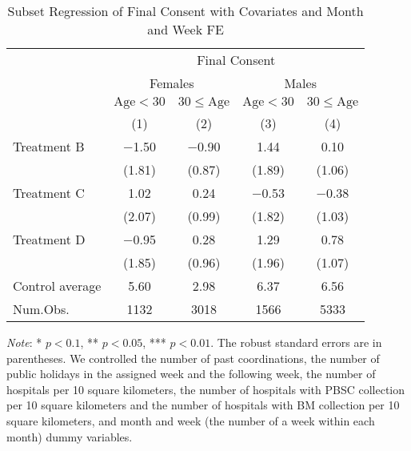 \documentclass[12pt, a4paper]{article}
\begin{document}
\begin{table}[H]

\caption{\label{tab:consent-lm-subset2}Subset Regression of Final Consent with Covariates and Month and Week FE}
\centering
\fontsize{8}{10}\selectfont
\begin{threeparttable}
\begin{tabular}[t]{lcccc}
\toprule
\multicolumn{1}{c}{ } & \multicolumn{4}{c}{Final Consent} \\
\cmidrule(l{3pt}r{3pt}){2-5}
\multicolumn{1}{c}{ } & \multicolumn{2}{c}{Females} & \multicolumn{2}{c}{Males} \\
\cmidrule(l{3pt}r{3pt}){2-3} \cmidrule(l{3pt}r{3pt}){4-5}
\multicolumn{1}{c}{ } & \multicolumn{1}{c}{$\text{Age} < 30$} & \multicolumn{1}{c}{$30 \le \text{Age}$} & \multicolumn{1}{c}{$\text{Age} < 30$} & \multicolumn{1}{c}{$30 \le \text{Age}$} \\
\cmidrule(l{3pt}r{3pt}){2-2} \cmidrule(l{3pt}r{3pt}){3-3} \cmidrule(l{3pt}r{3pt}){4-4} \cmidrule(l{3pt}r{3pt}){5-5}
  & (1) & (2) & (3) & (4)\\
\midrule
Treatment B & \num{-1.50} & \num{-0.90} & \num{1.44} & \num{0.10}\\
 & (\num{1.81}) & (\num{0.87}) & (\num{1.89}) & (\num{1.06})\\
Treatment C & \num{1.02} & \num{0.24} & \num{-0.53} & \num{-0.38}\\
 & (\num{2.07}) & (\num{0.99}) & (\num{1.82}) & (\num{1.03})\\
Treatment D & \num{-0.95} & \num{0.28} & \num{1.29} & \num{0.78}\\
 & (\num{1.85}) & (\num{0.96}) & (\num{1.96}) & (\num{1.07})\\
\midrule
Control average & 5.60 & 2.98 & 6.37 & 6.56\\
Num.Obs. & \num{1132} & \num{3018} & \num{1566} & \num{5333}\\
\bottomrule
\end{tabular}
\begin{tablenotes}
\item \emph{Note}: * $p < 0.1$, ** $p < 0.05$, *** $p < 0.01$. The robust standard errors are in parentheses. We controlled the number of past coordinations, the number of public holidays in the assigned week and the following week, the number of hospitals per 10 square kilometers, the number of hospitals with PBSC collection per 10 square kilometers and the number of hospitals with BM collection per 10 square kilometers, and month and week (the number of a week within each month) dummy variables.
\end{tablenotes}
\end{threeparttable}
\end{table}
\end{document}
